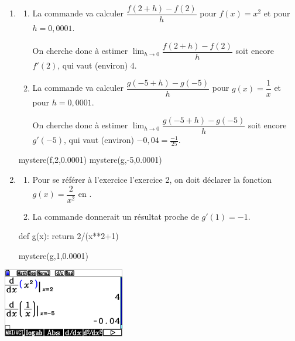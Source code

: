\documentclass[a4paper,11pt]{article}
\begin{document}
\begin{enumerate}
	\item 
	\begin{enumerate}
		\item La commande  va calculer $\dfrac{f(2+h)-f(2)}{h}$ pour $f(x)=x^2$ et pour $h = 0,0001$.
		
		On cherche donc à \og estimer \fg{} $\lim_{h \to 0} \dfrac{f(2+h)-f(2)}{h}$ soit encore $f'(2)$, qui vaut (environ) $4$.
		\item La commande  va calculer $\dfrac{g(-5+h)-g(-5)}{h}$ pour $g(x)=\dfrac{1}{x}$ et pour  $h = 0,0001$.
		
		On cherche donc à \og estimer \fg{} $\lim_{h \to 0} \dfrac{g(-5+h)-g(-5)}{h}$ soit encore $g'(-5)$, qui vaut (environ) $-0,04=\tfrac{-1}{25}$.
	\end{enumerate}
	\begin{envconsolepython}[15cm]
		mystere(f,2,0.0001)
		mystere(g,-5,0.0001)
	\end{envconsolepython}
	\item 
	\begin{enumerate}
		\item Pour se référer à l'exercice l'\textcolor{titrebleu}{exercice 2}, on doit déclarer la fonction $g(x)=\dfrac{2}{x^2}$ en .
		\item La commande  donnerait un résultat proche de $g'(1) = -1$.
	\end{enumerate}
	\begin{envconsolepython}[15cm]
		def g(x):
			return 2/(x**2+1)
		
		mystere(g,1,0.0001)
	\end{envconsolepython}
\end{enumerate}

\begin{center}
	\includegraphics[height=3cm]{chap07_exos_corr_5}
\end{center}
\end{document}

